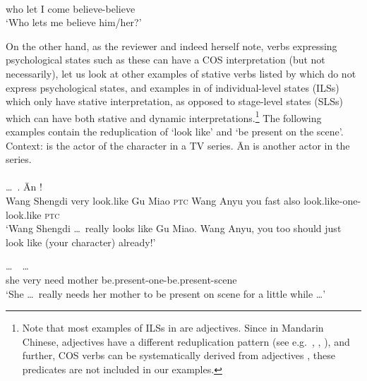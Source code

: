 \ex\label{ex:xiangxin}%
\gll {}    \\
who let I come believe-believe\\
\glt `Who lets me believe him/her?'
\z

On the other hand, as the reviewer %
and indeed \citet[669--670]{Tham2013} herself note,
verbs expressing psychological states such as these can have a COS interpretation (but not necessarily),
let us look at other examples of stative verbs listed by \citet[680]{PeckEtAl2013} which do not express psychological states,
and examples in  \citet[Sec.\,3.3.3]{XiaoMcEnery2004} of individual-level states (ILSs) which only have stative interpretation,
as opposed to stage-level states (SLSs) which can have both stative and dynamic interpretations.\footnote{
    Note that most examples of ILSs in \citet[Sec.\,3.3.3]{XiaoMcEnery2004} are adjectives.
    Since in Mandarin Chinese, adjectives have a different reduplication pattern (see e.g.\ \citealt[Sec.\,2.2]{Tsao2001}, \citealt[Sec.\,4.1]{FanSongBond2015}, \citealt[Sec.\,3]{Sui2018}),
    and further, COS verbs can be systematically derived from adjectives \citep[Sec.\,3]{Tham2013},
    these predicates are not included in our examples.}
The following examples contain the reduplication of  `look like' and  `be present on the scene'.
\ea\label{ex:xiang}%
Context:   is the actor of the character   in a TV series.
 Ān is another actor in the series.\\
\\
\gll {}  \ldots\,     .  Ān     !\footnotemark\\
Wang Shengdi {} very look.like Gu Miao \textsc{ptc} Wang Anyu you fast also look.like-one-look.like \textsc{ptc}\\
\glt `Wang Shengdi \ldots\,  really looks like Gu Miao. Wang Anyu, you too should just look like (your character) already!'

\ex\label{ex:zaichang}%
\gll {} \ldots\,    ~\ldots\\
she {} very need mother be.present-one-be.present-scene\\
\glt `She \ldots\, really needs her mother to be present on scene for a little while \ldots'
\z
{}

